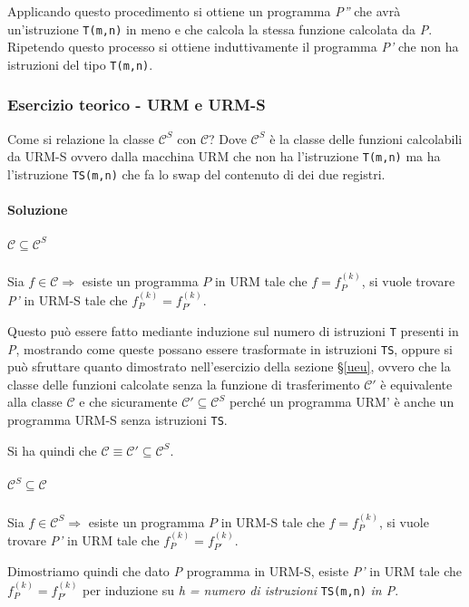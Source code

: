 Applicando questo procedimento si ottiene un programma \emph{P''} che avrà un'istruzione \texttt{T(m,n)} in meno e che calcola la stessa funzione calcolata da \emph{P}.
Ripetendo questo processo si ottiene induttivamente il programma \emph{P'} che non ha istruzioni del tipo \texttt{T(m,n)}.

\subsubsection{Esercizio teorico - URM e URM-S}\label{esercizio-teorico---urm-e-urm-s}

Come si relazione la classe $\mathcal{C}^S$ con $\mathcal{C}$? Dove $\mathcal{C}^S$ è la classe delle funzioni calcolabili da URM-S ovvero dalla macchina URM che non ha l'istruzione \texttt{T(m,n)} ma ha l'istruzione \texttt{TS(m,n)} che fa lo swap del contenuto di dei due registri.

\paragraph{Soluzione}

\subparagraph{$\mathcal{C} \subseteq \mathcal{C}^S$}

Sia $f \in \mathcal{C} \Rightarrow$ esiste un programma $P$ in URM tale che $f = f_P^{(k)}$, si vuole trovare \textit{P'} in URM-S tale che $f_P^{(k)} = f_{P'}^{(k)}$.

Questo può essere fatto mediante induzione sul numero di istruzioni \texttt{T} presenti in \textit{P}, mostrando come queste possano essere trasformate in istruzioni \texttt{TS}, oppure si può sfruttare quanto dimostrato nell'esercizio della sezione §\ref{ueu}, ovvero che la classe delle funzioni calcolate senza la funzione di trasferimento $\mathcal{C}'$ è equivalente alla classe $\mathcal{C}$ e che sicuramente $\mathcal{C}' \subseteq \mathcal{C}^S$ perché un programma URM' è anche un programma URM-S senza istruzioni \texttt{TS}.

Si ha quindi che $\mathcal{C} \equiv \mathcal{C}' \subseteq \mathcal{C}^S$.

\subparagraph{$\mathcal{C}^S \subseteq \mathcal{C}$}


Sia $f \in \mathcal{C}^S \Rightarrow$ esiste un programma $P$ in URM-S tale che $f = f_P^{(k)}$, si vuole trovare \textit{P'} in URM tale che $f_P^{(k)} = f_{P'}^{(k)}$.

Dimostriamo quindi che dato \textit{P} programma in URM-S, esiste \textit{P'} in URM tale che
$f_P^{(k)} = f_{P'}^{(k)}$ per induzione su \textit{h = numero di istruzioni} \texttt{TS(m,n)}\textit{ in P}.


